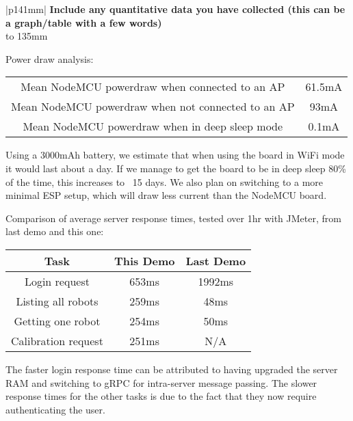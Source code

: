 \documentclass[a4paper]{article}
\newcommand{\colWidth}{141mm}
\begin{document}
\begin{center}

\begin{tabular}{|p{\colWidth}|}
	\hline
	\large
	\textbf{Include any quantitative data you have collected (this can be a graph/table with a few words)}
	\\ \hline
	\vtop to 135mm{
		Power draw analysis:

		\begin{tabular}{ | c | c | }
			\hline
			Mean NodeMCU powerdraw when connected to an AP & 61.5mA \\
			Mean NodeMCU powerdraw when not connected to an AP &  93mA \\
			Mean NodeMCU powerdraw when in deep sleep mode & 0.1mA \\
			\hline
		\end{tabular}

		Using a 3000mAh battery, we estimate that when using the board in WiFi mode it would last about a day.
		If we manage to get the board to be in deep sleep 80\% of the time, this increases to ~15 days.
		We also plan on switching to a more minimal ESP setup, which will draw less current than the NodeMCU board.

		\vspace{2mm}
		
		Comparison of average server response times, tested over 1hr with JMeter, from last demo and this one:

		\begin{tabular}{ | c | c | c |}
			\hline
			Task & This Demo & Last Demo \\
			\hline
			Login request & 653ms & 1992ms \\
			Listing all robots & 259ms & 48ms \\
			Getting one robot & 254ms & 50ms \\
			Calibration request & 251ms & N/A \\
			\hline
		\end{tabular}

		The faster login response time can be attributed to having upgraded the server RAM and switching to gRPC for intra-server message passing.
		The slower response times for the other tasks is due to the fact that they now require authenticating the user.

  }
  \\
  \hline
\end{tabular}
\vskip 5mm



\end{center}
\end{document}
